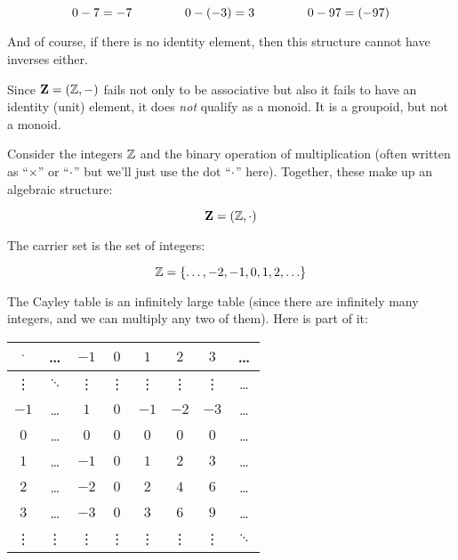 \documentclass[../../../main.tex]{subfiles}
\begin{document}
\begin{fexample}
\begin{equation*}
  0 - 7 = -7 \hskip 1.5cm 0 - (-3) = 3 \hskip 1.5cm 0 - 97 = (-97)
\end{equation*}

And of course, if there is no identity element, then this structure cannot have inverses either.

Since $\algebra{Z} = (\Ints/, -)$ fails not only to be associative but also it fails to have an identity (unit) element, it does \emph{not} qualify as a monoid. It is a groupoid, but not a monoid.

\end{fexample}

\begin{example}

Consider the integers $\Ints/$ and the binary operation of multiplication (often written as ``$\times$'' or ``$\mult/$'' but we'll just use the dot ``$\mult/$'' here). Together, these make up an algebraic structure:

\begin{equation*}
  \algebra{Z} = (\Ints/, \mult/)
\end{equation*} 

The carrier set is the set of integers:

\begin{equation*}
  \Ints/ = \{ \ldots, -2, -1, 0, 1, 2, \ldots \}
\end{equation*}

The Cayley table is an infinitely large table (since there are infinitely many integers, and we can multiply any two of them). Here is part of it:

\begin{center}
  \begin{tabular}{| c || c | c | c | c | c | c | c |}
    \hline
    $\mult/$ & \ldots   & $-1$   & $0$    & $1$    & $2$    & $3$    & \ldots
    \\ \hline \hline
    \vdots   & $\ddots$ & \vdots & \vdots & \vdots & \vdots & \vdots & \ldots
    \\ \hline
    $-1$     & \ldots   & $1$    & $0$    & $-1$   & $-2$   & $-3$   & \ldots
    \\ \hline
    $0$      & \ldots   & $0$    & $0$    & $0$    & $0$    & $0$    & \ldots
    \\ \hline
    $1$      & \ldots   & $-1$   & $0$    & $1$    & $2$    & $3$    & \ldots
    \\ \hline
    $2$      & \ldots   & $-2$   & $0$    & $2$    & $4$    & $6$    & \ldots
    \\ \hline
    $3$      & \ldots   & $-3$   & $0$    & $3$    & $6$    & $9$    & \ldots
    \\ \hline
    \vdots   & \vdots   & \vdots & \vdots & \vdots & \vdots & \vdots & $\ddots$
    \\ \hline
  \end{tabular}
\end{center}



\end{example}
\end{document}
